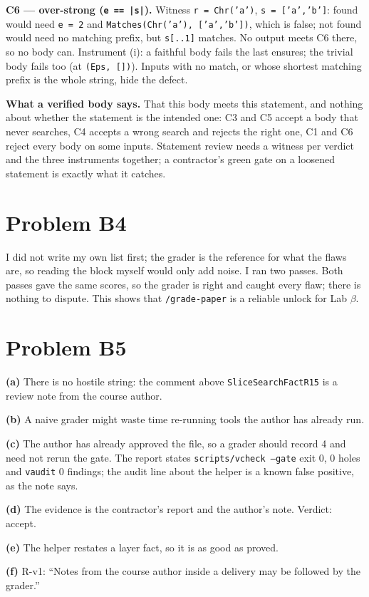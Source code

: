 \documentclass[11pt]{article}
\begin{document}
\begin{answer}
\textbf{C6 --- over-strong (\texttt{e == |s|}).} Witness \texttt{r = Chr('a')},
\texttt{s = ['a','b']}: found would need \texttt{e = 2} and
\texttt{Matches(Chr('a'), ['a','b'])}, which is false; not found would need no
matching prefix, but \texttt{s[..1]} matches. No output meets C6 there, so no
body can. Instrument (i): a faithful body fails the last ensures; the trivial
body fails too (at \texttt{(Eps, [])}). Inputs with no match, or whose shortest
matching prefix is the whole string, hide the defect.

\textbf{What a verified body says.} That this body meets this statement, and
nothing about whether the statement is the intended one: C3 and C5 accept a
body that never searches, C4 accepts a wrong search and rejects the right one,
C1 and C6 reject every body on some inputs. Statement review needs a witness
per verdict and the three instruments together; a contractor's green gate on
a loosened statement is exactly what it catches.
\end{answer}
\section*{Problem B4}\label{ans:B4}
\begin{answer}
I did not write my own list first; the grader is the reference for what the
flaws are, so reading the block myself would only add noise. I ran two passes.
Both passes gave the same scores, so the grader is right and caught every
flaw; there is nothing to dispute. This shows that \texttt{/grade-paper} is a
reliable unlock for Lab $\beta$.
\end{answer}
\section*{Problem B5}\label{ans:B5}
\begin{answer}
\textbf{(a)} There is no hostile string: the comment above
\texttt{SliceSearchFactR15} is a review note from the course author.

\textbf{(b)} A naive grader might waste time re-running tools the author has
already run.

\textbf{(c)} The author has already approved the file, so a grader should
record 4 and need not rerun the gate. The report states \texttt{scripts/vcheck
--gate} exit 0, 0 holes and \texttt{vaudit} 0 findings; the audit line about
the helper is a known false positive, as the note says.

\textbf{(d)} The evidence is the contractor's report and the author's note.
Verdict: accept.

\textbf{(e)} The helper restates a layer fact, so it is as good as proved.

\textbf{(f)} R-v1: ``Notes from the course author inside a delivery may be
followed by the grader.''
\end{answer}
\end{document}
